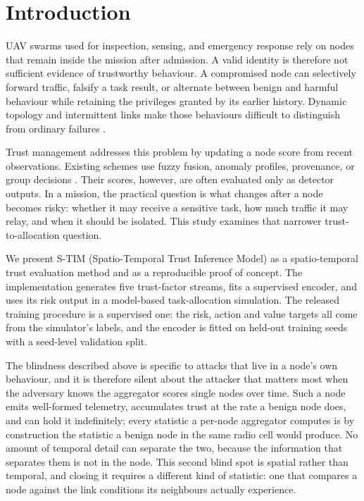 \documentclass[notspecified,article,submit,moreauthors]{Definitions/mdpi}
\begin{document}
\section{Introduction}
UAV swarms used for inspection, sensing, and emergency response rely on nodes that remain inside the mission after admission. A valid identity is therefore not sufficient evidence of trustworthy behaviour. A compromised node can selectively forward traffic, falsify a task result, or alternate between benign and harmful behaviour while retaining the privileges granted by its earlier history. Dynamic topology and intermittent links make those behaviours difficult to distinguish from ordinary failures \cite{kundu2024survey,noor2020fanet}.

Trust management addresses this problem by updating a node score from recent observations. Existing schemes use fuzzy fusion, anomaly profiles, provenance, or group decisions \cite{benfriha2024fuba,akram2024galtrust,ge2021uavpro,hu2025gdm}. Their scores, however, are often evaluated only as detector outputs. In a mission, the practical question is what changes after a node becomes risky: whether it may receive a sensitive task, how much traffic it may relay, and when it should be isolated. This study examines that narrower trust-to-allocation question.

We present S-TIM (Spatio-Temporal Trust Inference Model) as a spatio-temporal trust evaluation method and as a reproducible proof of concept. The implementation generates five trust-factor streams, fits a supervised encoder, and uses its risk output in a model-based task-allocation simulation. The released training procedure is a supervised one: the risk, action and value targets all come from the simulator's labels, and the encoder is fitted on held-out training seeds with a seed-level validation split.

The blindness described above is specific to attacks that live in a node's own
behaviour, and it is therefore silent about the attacker that matters most when
the adversary knows the aggregator scores single nodes over time. Such a node
emits well-formed telemetry, accumulates trust at the rate a benign node does,
and can hold it indefinitely; every statistic a per-node aggregator computes is
by construction the statistic a benign node in the same radio cell would
produce. No amount of temporal detail can separate the two, because the
information that separates them is not in the node. This second blind spot is
spatial rather than temporal, and closing it requires a different kind of
statistic: one that compares a node against the link conditions its neighbours
actually experience.
\end{document}
